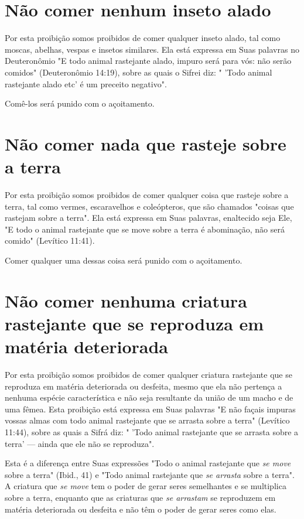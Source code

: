 \begin{itemize}
\begin{enumrate}
\begin{itemize}
\begin{itemize}
\begin{itemize}
\section{Não comer nenhum inseto alado}

Por esta proibição somos proibidos de comer qualquer inseto ala­do, tal
como moscas, abelhas, vespas e insetos similares. Ela está expressa em
Suas palavras no Deuteronômio "E todo animal rastejante alado, impuro
será para vós: não serão comidos" (Deuteronômio 14:19), sobre as quais o
Sifrei diz: " 'Todo animal rastejante alado etc' é um preceito
negativo".

Comê-los será punido com o açoitamento.

\section{Não comer nada que rasteje sobre a terra}

Por esta proibição somos proibidos de comer qualquer coisa que ras­teje
sobre a terra, tal como vermes, escaravelhos e coleópteros, que são
chama­dos "coisas que rastejam sobre a terra". Ela está expressa em Suas
palavras, enal­tecido seja Ele, "E todo o animal rastejante que se move
sobre a terra é abomi­nação, não será comido" (Levítico 11:41).


Comer qualquer uma dessas coisa será punido com o açoitamento.



\section{Não comer nenhuma criatura rastejante que se reproduza em matéria deteriorada}

Por esta proibição somos proibidos de comer qualquer criatura
ras­tejante que se reproduza em matéria deteriorada ou desfeita, mesmo
que ela não pertença a nenhuma espécie característica e não seja
resultante da união de um macho e de uma fêmea. Esta proibição está
expressa em Suas palavras "E não façais impuras vossas 
almas com todo animal rastejante que se
arrasta sobre a terra" (Levítico 11:44), sobre as quais a Sifrá diz: "
'Todo animal raste­jante que se arrasta sobre a terra' --- ainda que ele
não se reproduza".

Esta é a diferença entre Suas expressões "Todo o animal rastejante que
\emph{se move} sobre a terra" (Ibid., 41) e "Todo animal rastejante que
\emph{se arrasta} sobre a terra". A criatura que \emph{se move} tem o
poder de gerar seres semelhantes e se multiplica sobre a terra, enquanto
que as criaturas que \emph{se arrastam} se re­produzem em matéria
deteriorada ou desfeita e não têm o poder de gerar seres como elas.


\end{itemize}
\end{itemize}
\end{itemize}
\end{enumrate}
\end{itemize}
